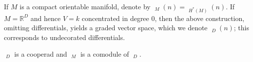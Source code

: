 \documentclass{scrartcl}
\theoremstyle{plain}
\theoremstyle{definition}
\newcommand{\R}{\mathbb R}
\DeclareMathOperator{\coGra}{{}^*Gra}
\newcommand{\blank}{-}
\begin{document}




If $M$ is a compact orientable manifold, denote by $\coGra_M(n) = \coGra_{H^*(M)}(n)$. If $M = \R^D$ and hence $V=k$ concentrated in degree $0$, then the above construction, omitting differentials, yields a graded vector space, which we denote $\coGra_D(n)$; this corresponds to undecorated differentials. 

$\coGra_D$ is a cooperad and $\coGra_M$ is a comodule of $\coGra_D$. 
\end{document}
